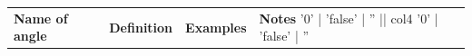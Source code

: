 \begin{table}[H]
    
            
    
        \begin{center}
      
      \label{m38380*uid30}
      
    \noindent
      \tablelasttail{}
     
\begin{xtabular*}{\mytablewidth}[t]{|p{3cm}|p{3cm}|p{3cm}|p{20\mystarwidth}|}
\hline
    
    
        
                  \textbf{Name of angle}
                 &
    
    
        
                  \textbf{Definition}
                 &
    
    
        
                  \textbf{Examples}
                 &
    
    
        
                  \textbf{Notes}
'0' | 'false' | '' || col4 '0' | 'false' | ''
     \tabularnewline{}
    

\end{xtabular*}
\end{center}
\end{table}
